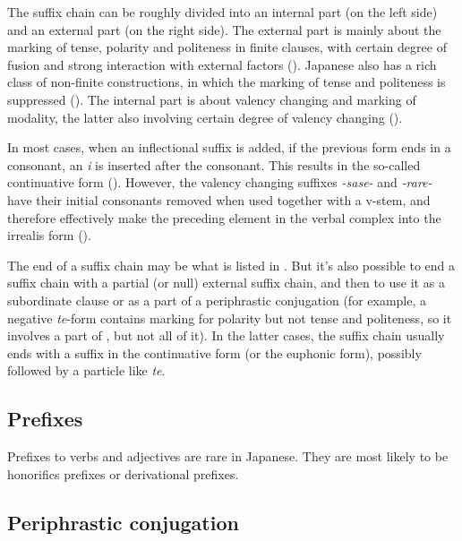 \documentclass[UTF8, a4paper, oneside, scheme=plain]{ctexrep}
\newcommand{\corpus}[1]{\emph{#1}}
\begin{document}
The suffix chain can be roughly divided into an internal part (on the left side) 
and an external part (on the right side). 
The external part is mainly about 
the marking of tense, polarity and politeness in finite clauses,
with certain degree of fusion
and strong interaction with external factors ().
Japanese also has a rich class of non-finite constructions,
in which the marking of tense and politeness is suppressed ().
The internal part is about valency changing and marking of modality,
the latter also involving certain degree of valency changing ().

In most cases,
when an inflectional suffix is added,
if the previous form ends in a consonant,
an \corpus{i} is inserted after the consonant.
This results in the so-called continuative form ().
However, the valency changing suffixes \corpus{-sase-} and \corpus{-rare-}
have their initial consonants removed when used together with a v-stem,
and therefore effectively make the preceding element in the verbal complex into the irrealis form 
().

The end of a suffix chain may be what is listed in
.
But it's also possible to end a suffix chain with a partial (or null) external suffix chain,
and then to use it as a subordinate clause or as a part of a periphrastic conjugation
(for example, a negative \corpus{te}-form contains marking for polarity but not tense and politeness,
so it involves a part of ,
but not all of it).
In the latter cases, 
the suffix chain usually ends with a suffix in the continuative form
(or the euphonic form),
possibly followed by a particle like \corpus{te}.

\subsection{Prefixes}\label{sec:prefixes}

Prefixes to verbs and adjectives are rare in Japanese.
They are most likely to be honorifics prefixes or derivational prefixes.

\subsection{Periphrastic conjugation}\label{sec:periphrastic}
\end{document}
